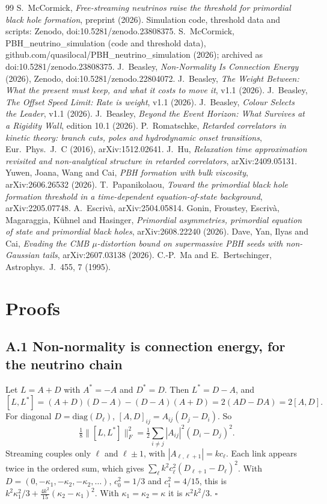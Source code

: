 \documentclass[11pt]{article}
\begin{document}
\begin{thebibliography}{99}
 S.~McCormick, \emph{Free-streaming neutrinos raise the threshold for primordial black hole formation}, preprint (2026). Simulation code, threshold data and scripts: Zenodo, doi:10.5281/zenodo.23808375.
 S.~McCormick, PBH\_neutrino\_simulation (code and threshold data), github.com/quasilocal/PBH\_neutrino\_simulation (2026); archived as doi:10.5281/zenodo.23808375.
 J.~Beasley, \emph{Non-Normality Is Connection Energy} (2026), Zenodo, doi:10.5281/zenodo.22804072.
 J.~Beasley, \emph{The Weight Between: What the present must keep, and what it costs to move it}, v1.1 (2026).
 J.~Beasley, \emph{The Offset Speed Limit: Rate is weight}, v1.1 (2026).
 J.~Beasley, \emph{Colour Selects the Leader}, v1.1 (2026).
 J.~Beasley, \emph{Beyond the Event Horizon: What Survives at a Rigidity Wall}, edition 10.1 (2026).
 P.~Romatschke, \emph{Retarded correlators in kinetic theory: branch cuts, poles and hydrodynamic onset transitions}, Eur.\ Phys.\ J.\ C (2016), arXiv:1512.02641.
 J.~Hu, \emph{Relaxation time approximation revisited and non-analytical structure in retarded correlators}, arXiv:2409.05131.
 Yuwen, Joana, Wang and Cai, \emph{PBH formation with bulk viscosity}, arXiv:2606.26532 (2026).
 T.~Papanikolaou, \emph{Toward the primordial black hole formation threshold in a time-dependent equation-of-state background}, arXiv:2205.07748.
 A.~Escriv\`a, arXiv:2504.05814.
 Gonin, Froustey, Escriv\`a, Magaraggia, K\"uhnel and Hasinger, \emph{Primordial asymmetries, primordial equation of state and primordial black holes}, arXiv:2608.22240 (2026).
 Dave, Yan, Ilyas and Cai, \emph{Evading the CMB $\mu$-distortion bound on supermassive PBH seeds with non-Gaussian tails}, arXiv:2607.03138 (2026).
 C.-P.~Ma and E.~Bertschinger, Astrophys.\ J.\ 455, 7 (1995).
\end{thebibliography}

\appendix
\section{Proofs}
\subsection*{A.1 Non-normality is connection energy, for the neutrino chain}
Let $L=A+D$ with $A^\ast=-A$ and $D^\ast=D$. Then $L^\ast=D-A$, and
\[
[L,L^\ast]=(A+D)(D-A)-(D-A)(A+D)=2(AD-DA)=2[A,D].
\]
For diagonal $D=\mathrm{diag}(D_\ell)$, $[A,D]_{ij}=A_{ij}(D_j-D_i)$. So
\[
\tfrac18\lVert[L,L^\ast]\rVert_F^2=\tfrac12\sum_{i\neq j}|A_{ij}|^2(D_i-D_j)^2 .
\]
Streaming couples only $\ell$ and $\ell\pm1$, with $|A_{\ell,\ell+1}|=kc_\ell$. Each link appears twice in the ordered sum, which gives $\sum_\ell k^2c_\ell^2(D_{\ell+1}-D_\ell)^2$. With $D=(0,-\kappa_1,-\kappa_2,-\kappa_2,\dots)$, $c_0^2=1/3$ and $c_1^2=4/15$, this is $k^2\kappa_1^2/3+\tfrac{4k^2}{15}(\kappa_2-\kappa_1)^2$. With $\kappa_1=\kappa_2=\kappa$ it is $\kappa^2k^2/3$. $\square$
\end{document}
